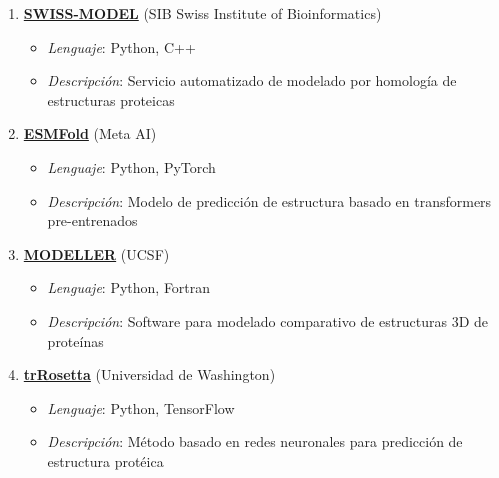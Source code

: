 \documentclass[11pt,a4paper]{article}
\begin{document}
\begin{enumerate}[noitemsep,topsep=0pt,leftmargin=*]
    \item \textbf{\href{https://swissmodel.expasy.org/}{SWISS-MODEL}} (SIB Swiss Institute of Bioinformatics)
    \begin{itemize}[noitemsep,topsep=0pt]
      \item \textit{Lenguaje}: Python, C++
      \item \textit{Descripción}: Servicio automatizado de modelado por homología de estructuras proteicas
    \end{itemize}
    
    \item \textbf{\href{https://github.com/facebookresearch/esm}{ESMFold}} (Meta AI)
    \begin{itemize}[noitemsep,topsep=0pt]
      \item \textit{Lenguaje}: Python, PyTorch
      \item \textit{Descripción}: Modelo de predicción de estructura basado en transformers pre-entrenados
    \end{itemize}
    
    \item \textbf{\href{https://salilab.org/modeller/}{MODELLER}} (UCSF)
    \begin{itemize}[noitemsep,topsep=0pt]
      \item \textit{Lenguaje}: Python, Fortran
      \item \textit{Descripción}: Software para modelado comparativo de estructuras 3D de proteínas
    \end{itemize}
    
    \item \textbf{\href{https://github.com/gjoni/trRosetta}{trRosetta}} (Universidad de Washington)
    \begin{itemize}[noitemsep,topsep=0pt]
      \item \textit{Lenguaje}: Python, TensorFlow
      \item \textit{Descripción}: Método basado en redes neuronales para predicción de estructura protéica
    \end{itemize}
    

\end{enumerate}
\end{document}
